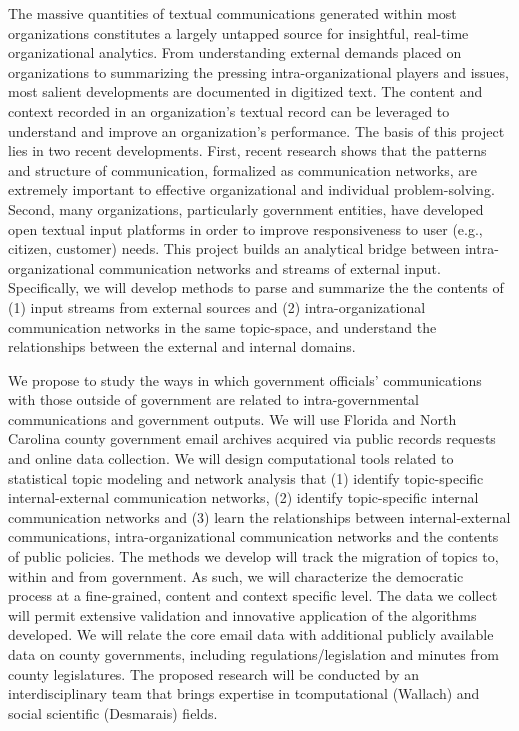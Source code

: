 

 \vspace{.1cm}

\noindent The massive quantities of textual communications generated within most organizations constitutes a largely untapped source for insightful, real-time organizational analytics. From understanding external demands placed on organizations to summarizing the pressing intra-organizational players and issues, most salient developments are documented in digitized text. The content and context recorded in an organization's textual record can be leveraged to understand and improve an organization's performance. The basis of this project lies in two recent developments. First, recent research shows that the patterns and structure of communication, formalized as communication networks, are extremely important to effective organizational and individual problem-solving.  Second, many organizations, particularly government entities, have developed open textual input platforms in order to improve responsiveness to user (e.g., citizen, customer) needs. This project builds an analytical bridge between intra-organizational communication networks and streams of external input. Specifically, we will develop methods to parse and summarize the the contents of (1) input streams from external sources and (2) intra-organizational communication networks in the same topic-space, and understand the relationships between the external and internal domains.  \vspace{.25cm}


 We propose to study the ways in which government officials' communications with those outside of government are related to intra-governmental communications and government outputs. We will use Florida and North Carolina county government email archives acquired via public records requests and online data collection. We will design computational tools related to statistical topic modeling and network analysis that (1) identify topic-specific internal-external communication networks, (2) identify topic-specific internal communication networks and (3) learn the relationships between internal-external communications, intra-organizational communication networks and the contents of public policies.  The methods we develop will track the migration of topics to, within and from government. As such, we will characterize the democratic process at a fine-grained, content and context specific level.  The data we collect will permit extensive validation and innovative application of the algorithms developed. We will relate the core email data with additional publicly available data on county governments, including regulations/legislation and minutes from county legislatures. The proposed research will be conducted by an interdisciplinary team that brings expertise in tcomputational (Wallach) and social scientific (Desmarais) fields. \vspace{.25cm}

